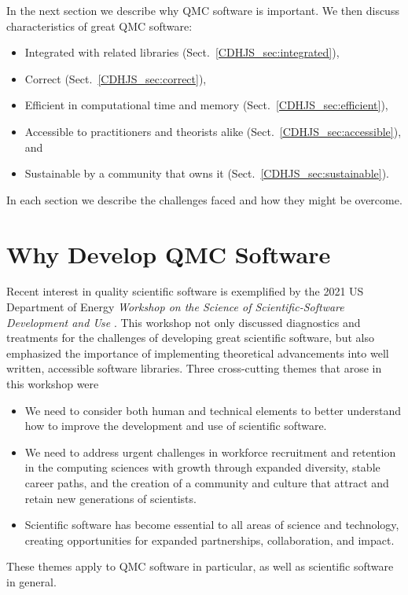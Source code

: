 \documentclass[graybox]{svmult}
\begin{document}
In the next section we describe why QMC software is important.  We then discuss characteristics of great QMC software:

\begin{itemize}
\item Integrated with related libraries (Sect.\ \ref{CDHJS_sec:integrated}),

\item Correct (Sect.\ \ref{CDHJS_sec:correct}),

\item Efficient in computational time and memory (Sect.\ \ref{CDHJS_sec:efficient}),

\item Accessible to practitioners and theorists alike (Sect.\ \ref{CDHJS_sec:accessible}), and

\item Sustainable by a community that owns it (Sect.\ \ref{CDHJS_sec:sustainable}).

\end{itemize}

In each section we describe the challenges faced and how they might be overcome.  



\section{Why Develop QMC Software} \label{CDHJS_sec:why_we_need_software}

Recent interest in quality scientific software is exemplified by the 2021 US Department of Energy \emph{Workshop on the Science of Scientific-Software Development and Use} \cite{ASCR-SSSDU,osti_1846008}. This workshop not only discussed diagnostics and treatments for the challenges of developing great scientific software, but also emphasized the importance of implementing theoretical advancements into well written, accessible software libraries. Three cross-cutting themes that arose in this workshop were
\begin{itemize}
    \item  We need to consider both human and technical elements to better understand how to improve the development and use of scientific software.

    \item We need to address urgent challenges in workforce recruitment and retention in the computing sciences with growth through expanded diversity, stable career paths, and the creation of a community and culture that attract and retain new generations of scientists.

    \item Scientific software has become essential to all areas of science and technology, creating opportunities for expanded partnerships, collaboration, and impact.
\end{itemize}
These themes apply to QMC software in particular, as well as scientific software in general.
\end{document}

